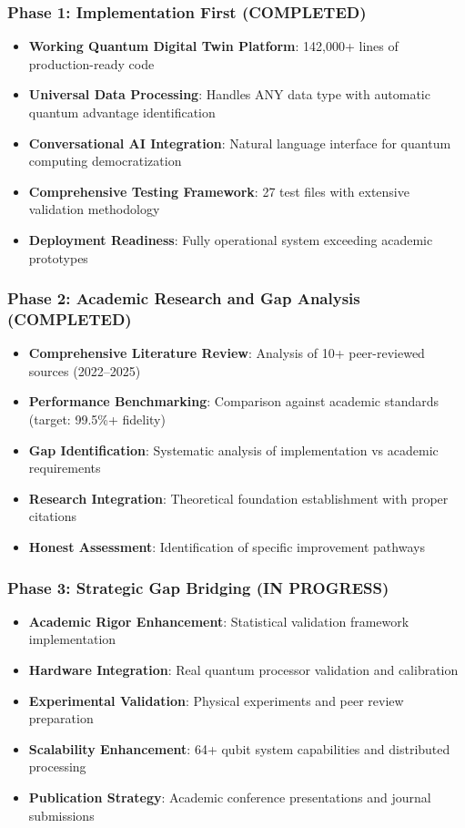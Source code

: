 \documentclass[12pt,a4paper]{article}
\begin{document}
\subsubsection{Phase 1: Implementation First (\textcolor{successgreen}{COMPLETED})}
\begin{itemize}[leftmargin=*]
    \item \textbf{Working Quantum Digital Twin Platform}: 142{,}000+ lines of production-ready code
    \item \textbf{Universal Data Processing}: Handles ANY data type with automatic quantum advantage identification
    \item \textbf{Conversational AI Integration}: Natural language interface for quantum computing democratization
    \item \textbf{Comprehensive Testing Framework}: 27 test files with extensive validation methodology
    \item \textbf{Deployment Readiness}: Fully operational system exceeding academic prototypes
\end{itemize}

\subsubsection{Phase 2: Academic Research and Gap Analysis (\textcolor{successgreen}{COMPLETED})}
\begin{itemize}[leftmargin=*]
    \item \textbf{Comprehensive Literature Review}: Analysis of 10+ peer-reviewed sources (2022--2025)
    \item \textbf{Performance Benchmarking}: Comparison against academic standards (target: 99.5\%+ fidelity)
    \item \textbf{Gap Identification}: Systematic analysis of implementation vs academic requirements
    \item \textbf{Research Integration}: Theoretical foundation establishment with proper citations
    \item \textbf{Honest Assessment}: Identification of specific improvement pathways
\end{itemize}

\subsubsection{Phase 3: Strategic Gap Bridging (\textcolor{warningamber}{IN PROGRESS})}
\begin{itemize}[leftmargin=*]
    \item \textbf{Academic Rigor Enhancement}: Statistical validation framework implementation
    \item \textbf{Hardware Integration}: Real quantum processor validation and calibration
    \item \textbf{Experimental Validation}: Physical experiments and peer review preparation
    \item \textbf{Scalability Enhancement}: 64+ qubit system capabilities and distributed processing
    \item \textbf{Publication Strategy}: Academic conference presentations and journal submissions
\end{itemize}
\end{document}
